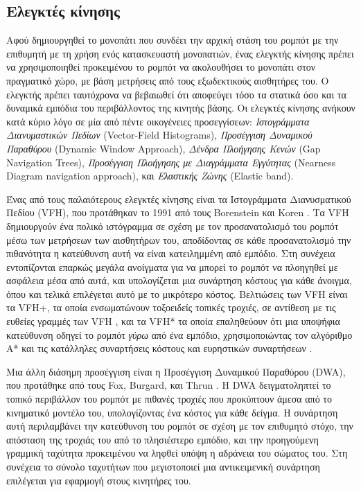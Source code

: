 \subsection{Ελεγκτές κίνησης}
\label{subsection:02_01_02:02}

Αφού δημιουργηθεί το μονοπάτι που συνδέει την αρχική στάση του ρομπότ με την
επιθυμητή με τη χρήση ενός κατασκευαστή μονοπατιών, ένας ελεγκτής κίνησης
πρέπει να χρησιμοποιηθεί προκειμένου το ρομπότ να ακολουθήσει το μονοπάτι στον
πραγματικό χώρο, με βάση μετρήσεις από τους εξωδεκτικούς αισθητήρες του. Ο
ελεγκτής πρέπει ταυτόχρονα να βεβαιωθεί ότι αποφεύγει τόσο τα στατικά όσο και
τα δυναμικά εμπόδια του περιβάλλοντος της κινητής βάσης. Οι ελεγκτές κίνησης
ανήκουν κατά κύριο λόγο σε μία από πέντε οικογένειες προσεγγίσεων:
\textit{Ιστογράμματα Διανυμαστικών Πεδίων} (Vector-Field Histograms),
\textit{Προσέγγιση Δυναμικού Παραθύρου} (Dynamic Window Approach),
\textit{Δένδρα Πλοήγησης Κενών} (Gap Navigation Trees), \textit{Προσέγγιση
Πλοήγησης με Διαγράμματα Εγγύτητας} (Nearness Diagram navigation approach), και
\textit{Ελαστικής Ζώνης} (Elastic band).

Ένας από τους παλαιότερους ελεγκτές κίνησης είναι τα Ιστογράμματα Διανυσματικού
Πεδίου (VFH), που προτάθηκαν το 1991 από τους Borenstein και Koren
\cite{Borenstein1991}. Τα VFH δημιουργούν ένα πολικό ιστόγραμμα σε σχέση με τον
προσανατολισμό του ρομπότ μέσω των μετρήσεων των αισθητήρων του, αποδίδοντας σε
κάθε προσανατολισμό την πιθανότητα η κατεύθυνση αυτή να είναι κατειλημμένη από
εμπόδιο. Στη συνέχεια εντοπίζονται επαρκώς μεγάλα ανοίγματα για να μπορεί το
ρομπότ να πλοηγηθεί με ασφάλεια μέσα από αυτά, και υπολογίζεται μια συνάρτηση
κόστους για κάθε άνοιγμα, όπου και τελικά επιλέγεται αυτό με το μικρότερο
κόστος.  Βελτιώσεις των VFH είναι τα VFH+, τα οποία ενσωματώνουν τοξοειδείς
τοπικές τροχιές, σε αντίθεση με τις ευθείες γραμμές των VFH \cite{Ulrich}, και
τα VFH* τα οποία επαληθεύουν ότι μια υποψήφια κατεύθυνση οδηγεί το ρομπότ
\textit{γύρω} από ένα εμπόδιο, χρησιμοποιώντας τον αλγόριθμο A* και τις
κατάλληλες συναρτήσεις κόστους και ευρηστικών συναρτήσεων \cite{Ulricha}.

Μια άλλη διάσημη προσέγγιση είναι η Προσέγγιση Δυναμικού Παραθύρου (DWA), που
προτάθηκε από τους Fox, Burgard, και Thrun \cite{Fox1997}. Η DWA δειγματοληπτεί
το τοπικό περιβάλλον του ρομπότ με πιθανές τροχιές που προκύπτουν άμεσα από το
κινηματικό μοντέλο του, υπολογίζοντας ένα κόστος για κάθε δείγμα. Η συνάρτηση
αυτή περιλαμβάνει την κατεύθυνση του ρομπότ σε σχέση με τον επιθυμητό στόχο,
την απόσταση της τροχιάς του από το πλησιέστερο εμπόδιο, και την προηγούμενη
γραμμική ταχύτητα προκειμένου να ληφθεί υπόψη η αδράνεια του σώματος του. Στη
συνέχεια το σύνολο ταχυτήτων που μεγιστοποιεί μια αντικειμενική συνάρτηση
επιλέγεται για εφαρμογή στους κινητήρες του.

